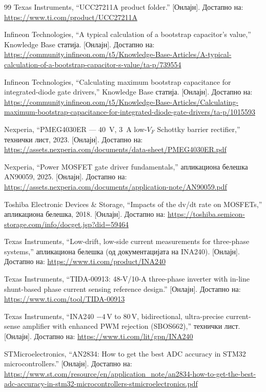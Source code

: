 \documentclass[journal,onecolumn,11pt]{IEEEtran}
\begin{document}
\begin{thebibliography}{99}
 Texas Instruments, ``UCC27211A product folder.'' [Онлајн]. Достапно на:
\url{https://www.ti.com/product/UCC27211A}

 Infineon Technologies, ``A typical calculation of a bootstrap capacitor's
value,'' Knowledge Base статија. [Онлајн]. Достапно на:
\url{https://community.infineon.com/t5/Knowledge-Base-Articles/A-typical-calculation-of-a-bootstrap-capacitor-s-value/ta-p/739554}

 Infineon Technologies, ``Calculating maximum bootstrap capacitance for
integrated-diode gate drivers,'' Knowledge Base статија. [Онлајн]. Достапно на:
\url{https://community.infineon.com/t5/Knowledge-Base-Articles/Calculating-maximum-bootstrap-capacitance-for-integrated-diode-gate-drivers/ta-p/1015593}

 Nexperia, ``PMEG4030ER --- \SI{40}{\volt}, \SI{3}{\ampere} low-$V_F$ Schottky
barrier rectifier,'' технички лист, 2023. [Онлајн]. Достапно на:
\url{https://assets.nexperia.com/documents/data-sheet/PMEG4030ER.pdf}

 Nexperia, ``Power MOSFET gate driver fundamentals,'' апликациона белешка
AN90059, 2025. [Онлајн]. Достапно на:
\url{https://assets.nexperia.com/documents/application-note/AN90059.pdf}

 Toshiba Electronic Devices \& Storage, ``Impacts of the dv/dt rate on
MOSFETs,'' апликациона белешка, 2018. [Онлајн]. Достапно на:
\url{https://toshiba.semicon-storage.com/info/docget.jsp?did=59464}

 Texas Instruments, ``Low-drift, low-side current measurements for
three-phase systems,'' апликациона белешка (од документацијата на INA240). [Онлајн]. Достапно на:
\url{https://www.ti.com/product/INA240}

 Texas Instruments, ``TIDA-00913: 48-V/10-A three-phase inverter with in-line
shunt-based phase current sensing reference design.'' [Онлајн]. Достапно на:
\url{https://www.ti.com/tool/TIDA-00913}

 Texas Instruments, ``INA240 $-4$\,V to $80$\,V, bidirectional, ultra-precise
current-sense amplifier with enhanced PWM rejection (SBOS662),'' технички лист. [Онлајн]. Достапно на:
\url{https://www.ti.com/lit/gpn/INA240}

 STMicroelectronics, ``AN2834: How to get the best ADC accuracy in STM32
microcontrollers.'' [Онлајн]. Достапно на:
\url{https://www.st.com/resource/en/application_note/an2834-how-to-get-the-best-adc-accuracy-in-stm32-microcontrollers-stmicroelectronics.pdf}


\end{thebibliography}
\end{document}
